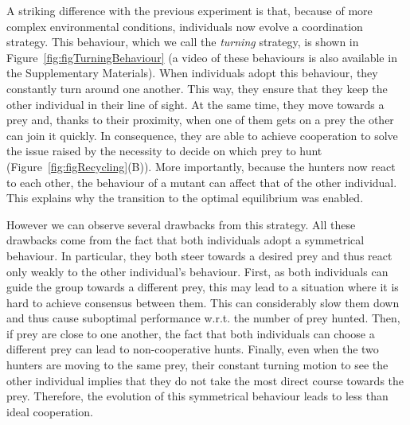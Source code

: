     A striking difference with the previous experiment is that, because of more complex environmental conditions, individuals now evolve a coordination strategy. This behaviour, which we call the \emph{turning} strategy, is shown in Figure~\ref{fig:figTurningBehaviour} (a video of these behaviours is also available in the Supplementary Materials). When individuals adopt this behaviour, they constantly turn around one another. This way, they ensure that they keep the other individual in their line of sight. At the same time, they move towards a prey and, thanks to their proximity, when one of them gets on a prey the other can join it quickly. In consequence, they are able to achieve cooperation to solve the issue raised by the necessity to decide on which prey to hunt (Figure~\ref{fig:figRecycling}(B)). More importantly, because the hunters now react to each other, the behaviour of a mutant can affect that of the other individual. This explains why the transition to the optimal equilibrium was enabled.

    However we can observe several drawbacks from this strategy. All these drawbacks come from the fact that both individuals adopt a symmetrical behaviour. In particular, they both steer towards a desired prey and thus react only weakly to the other individual's behaviour. First, as both individuals can guide the group towards a different prey, this may lead to a situation where it is hard to achieve consensus between them. This can considerably slow them down and thus cause suboptimal performance w.r.t. the number of prey hunted. Then, if prey are close to one another, the fact that both individuals can choose a different prey can lead to non-cooperative hunts. Finally, even when the two hunters are moving to the same prey, their constant turning motion to see the other individual implies that they do not take the most direct course towards the prey. Therefore, the evolution of this symmetrical behaviour leads to less than ideal cooperation.

